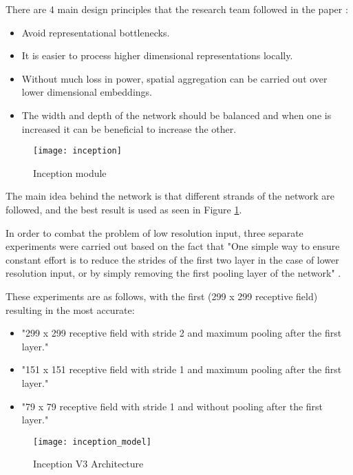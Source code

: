 There are 4 main design principles that the research team followed in the paper \parencite{rethinkingInception}:
\begin{itemize}
    \item{Avoid representational bottlenecks.}
    \item{It is easier to process higher dimensional representations locally.}
    \item{Without much loss in power, spatial aggregation can be carried out over lower dimensional embeddings.}
    \item{The width and depth of the network should be balanced and when one is increased it can be beneficial to increase the other.}
\end{itemize}

\begin{figure}[h]
    \centering
     \texttt{[image: inception]}
     \caption{Inception module \parencite{rethinkingInception}}
     \label{fig:inception}
\end{figure}

The main idea behind the network is that different strands of the network are followed, and the best result is used as seen in Figure \ref{fig:inception}.

In order to combat the problem of low resolution input, three separate experiments were carried out based on the fact that "One simple way to ensure constant effort is to reduce the strides of the first two layer in the case of lower resolution input, or by simply removing the first pooling layer of the network" \parencite{rethinkingInception}.

These experiments are as follows, with the first (299 x 299 receptive field) resulting in the most accurate:
\begin{itemize}
    \item{"299 x 299 receptive field with stride 2 and maximum pooling after the first layer." \parencite{rethinkingInception}}
    \item{"151 x 151 receptive field with stride 1 and maximum pooling after the first layer." \parencite{rethinkingInception}}
    \item{"79 x 79 receptive field with stride 1 and without pooling after the first layer." \parencite{rethinkingInception}}
\end{itemize}

\begin{sidewaysfigure}[h]
    \centering
     \texttt{[image: inception\_model]}
     \caption{Inception V3 Architecture \parencite{rethinkingInception}}
     \label{fig:inception_model}
\end{sidewaysfigure}


